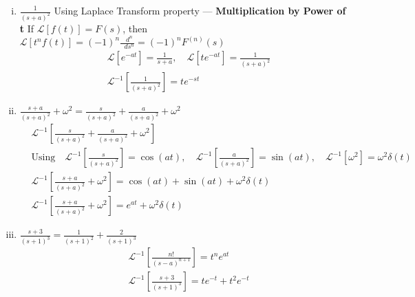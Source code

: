 \documentclass[12pt]{article}
\newenvironment{problem}[2][Problem]{\begin{trivlist}
		\item[\hskip \labelsep {\bfseries #1}\hskip \labelsep {\bfseries #2.}]}{\end{trivlist}}
\newcommand\diff{\mathop{}\!d}
\begin{document}
\begin{problem}{1 (B) --- Inverse Laplace Transforms} \hfill \break
		\begin{enumerate}[i)]
			\item $\displaystyle \frac{1}{(s+a)^2}$ 
			\hfill \break
			Using Laplace Transform property --- \textbf{Multiplication by Power of t} \newline
			If $\mathscr{L}[f(t)]=F(s)$, then $\mathscr{L}[t^nf(t)]=(-1)^n\frac{\diff^n}{\diff s^n}=(-1)^nF^{(n)}(s)$
				\begin{align*}
					&\mathscr{L}[e^{-at}] = \frac{1}{s+a}, \quad \mathscr{L}[te^{-at}]=\frac{1}{(s+a)^2} \\
					&\boxed{\mathscr{L^{-1}} \left[\frac{1}{(s+a)^2}\right] = te^{-st}}
				\end{align*} 
			\item $\displaystyle \frac{s+a}{(s+a)^2}+\omega^2=\frac{s}{(s+a)^2}+\frac{a}{(s+a)^2}+\omega^2$ \newline
				\begin{align*}
					& \mathscr{L^{-1}}[\frac{s}{(s+a)^2}+\frac{a}{(s+a)^2}+\omega^2] \\
					& \text{Using} \quad \mathscr{L^{-1}}[\frac{s}{(s+a)^2}]= \cos(at), \quad \mathscr{L^{-1}}[\frac{a}{(s+a)^2}] = \sin(at), \quad \mathscr{L^{-1}}[\omega^2]=\omega^2 \delta(t) \\
					& \mathscr{L^{-1}} \left[\frac{s+a}{(s+a)^2}+\omega^2 \right]= \cos(at) + \sin(at)+ \omega^2 \delta(t) \\
					& \boxed{\mathscr{L^{-1}} \left[\frac{s+a}{(s+a)^2}+\omega^2 \right] = e^{at}+\omega^2 \delta(t)}
				\end{align*}
			\item  $\displaystyle \frac{s+3}{(s+1)^3} = \frac{1}{(s+1)^2}+\frac{2}{(s+1)^3} $ \newline
			\begin{align*}
			& \mathscr{L}^{-1}[\frac{n!}{(s-a)^{n+1}}] = t^n e^{at} \\
			& \boxed{\mathscr{L}^{-1} \left[\frac{s+3}{(s+1)^3} \right]= te^{-t}+t^2e^{-t}}
			\end{align*}
		\end{enumerate}
\end{problem}
\end{document}
